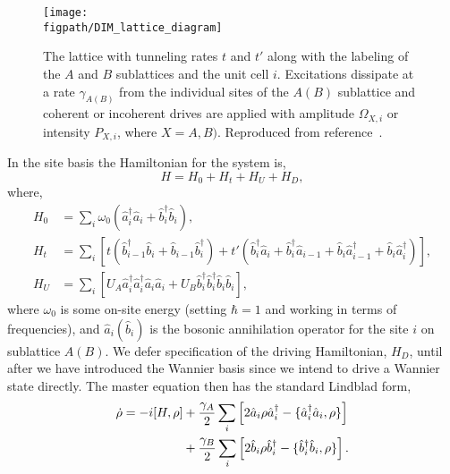 \begin{figure}[ht!]
\centering
\texttt{[image: \\figpath/DIM\_lattice\_diagram]}
\caption{The lattice with tunneling rates \(t\) and \(t'\) along with the labeling of the \(A\) and \(B\) sublattices and the unit cell \(i\). Excitations dissipate at a rate \(\gamma_{A(B)}\) from the individual sites of the \(A (B)\) sublattice and coherent or incoherent drives are applied with amplitude \(\Omega_{X, i}\) or intensity \(P_{X, i}\), where \(X = A,B)\). Reproduced from reference~\cite{Owen2017}.}
\label{fig:dim1-1}
\end{figure}

In the site basis the Hamiltonian for the system is,
\begin{equation}
	H = H_{0} + H_{t} + H_{U} + H_{D},
	\label{eq:dim1-1}
\end{equation}
where,
	\begin{align}
		H_{0} &= \sum_{i} \omega_{0}(\hat{a}_{i}^{\dagger}\hat{a}_{i} + \hat{b}_{i}^{\dagger}\hat{b}_{i}), \label{eq:dim1-2} \\
		H_{t} &= \sum_{i} \left[ t(\hat{b}_{i-1}^{\dagger}\hat{b}_{i} + \hat{b}_{i-1}\hat{b}_{i}^{\dagger}) + t'(\hat{b}_{i}^{\dagger}\hat{a}_{i} + \hat{b}_{i}^{\dagger}\hat{a}_{i-1} + \hat{b}_{i}\hat{a}_{i-1}^{\dagger} + \hat{b}_{i}\hat{a}_{i}^{\dagger})\right], \label{eq:dim1-3} \\
		H_{U} &= \sum_{i} \left[ U_{A}\hat{a}_{i}^{\dagger}\hat{a}_{i}^{\dagger}\hat{a}_{i}\hat{a}_{i} + U_{B}\hat{b}_{i}^{\dagger}\hat{b}_{i}^{\dagger}\hat{b}_{i}\hat{b}_{i}\right], \label{eq:dim1-4}
	\end{align}
	where \(\omega_{0}\) is some on-site energy (setting \(\hbar=1\) and working in terms of frequencies), and \(\hat{a}_{i} (\hat{b}_{i})\) is the bosonic annihilation operator for the site \(i\) on sublattice \(A(B)\). We defer specification of the driving Hamiltonian, \(H_{D}\), until after we have introduced the Wannier basis since we intend to drive a Wannier state directly. The master equation then has the standard Lindblad form,
	\begin{align}
		\dot{\rho} = -i[H, \rho] &+ \frac{\gamma_{A}}{2}\sum_{i}\left[ 2\hat{a}_{i}\rho\hat{a}_{i}^{\dagger} - \{\hat{a}_{i}^{\dagger}\hat{a}_{i}, \rho\} \right] \notag \\
		&+ \frac{\gamma_{B}}{2} \sum_{i} \left[ 2\hat{b}_{i}\rho\hat{b}_{i}^{\dagger} - \{\hat{b}_{i}^{\dagger}\hat{b}_{i}, \rho\} \right].
		\label{eq:dim1-5}
	\end{align}

